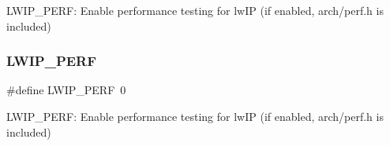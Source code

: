 L\+W\+I\+P\+\_\+\+P\+E\+RF\+: Enable performance testing for lw\+IP (if enabled, arch/perf.\+h is included) \mbox{\label{group__lwip__opts__perf_ga44acd95b33e2d58a74455279721298de}} 
\subsubsection{\texorpdfstring{L\+W\+I\+P\+\_\+\+P\+E\+RF}{LWIP\_PERF}\hspace{0.1cm}{\footnotesize\ttfamily [2/2]}}
{\footnotesize\ttfamily \#define L\+W\+I\+P\+\_\+\+P\+E\+RF~0}

L\+W\+I\+P\+\_\+\+P\+E\+RF\+: Enable performance testing for lw\+IP (if enabled, arch/perf.\+h is included) 